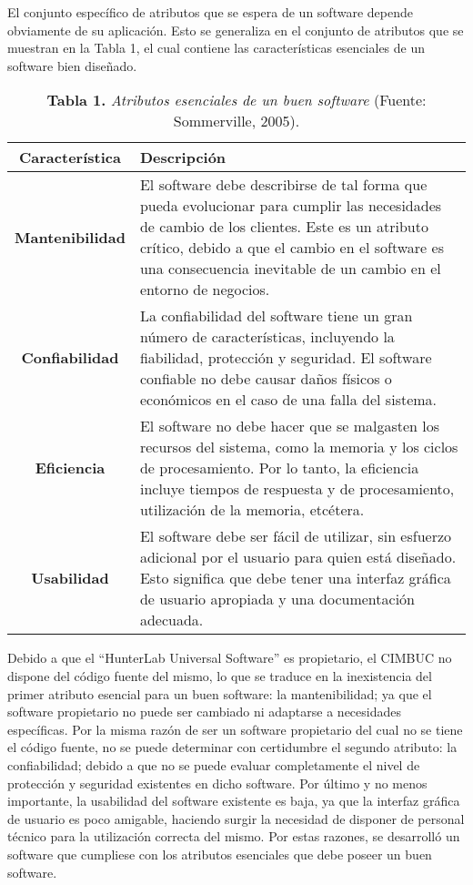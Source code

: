 El conjunto espec\'{i}fico de atributos que se espera de un software depende obviamente de su aplicaci\'{o}n. Esto se generaliza en el conjunto de atributos que se muestran en la Tabla 1, el cual contiene las caracter\'{i}sticas esenciales de un software bien dise\~{n}ado.

	\begin{table}[htb]
		\small
		\centering
		\setlength{\extrarowheight}{5pt}
		\begin{tabulary}{15cm}{|c|L|}
			\hline
			\textbf{Caracter\'{i}stica} & \textbf{Descripci\'{o}n}\\ \hline
			\textbf{Mantenibilidad} & El software debe describirse de tal forma que pueda evolucionar  para cumplir las necesidades de cambio de los 					clientes. Este es un atributo cr\'{i}tico, debido a que el cambio en el software es una consecuencia inevitable de un cambio en el entorno de negocios.\\ \hline
			\textbf{Confiabilidad} & La confiabilidad del software tiene un gran n\'{u}mero de caracter\'{i}sticas, incluyendo la fiabilidad, protecci\'{o}n y seguridad. El software confiable no debe causar da\~{n}os f\'{i}sicos o econ\'{o}micos en el caso de una falla del sistema.\\ \hline
			\textbf{Eficiencia} & El software no debe hacer que se malgasten los recursos del sistema, como la memoria y los ciclos de procesamiento. Por lo tanto, la eficiencia incluye tiempos de respuesta y de procesamiento, utilizaci\'{o}n de la memoria, etc\'{e}tera.\\ \hline
			\textbf{Usabilidad} & El software debe ser f\'{a}cil de utilizar, sin esfuerzo adicional por el usuario para quien est\'{a} dise\~{n}ado. Esto significa que debe tener una interfaz gr\'{a}fica de usuario apropiada y una documentaci\'{o}n adecuada.\\ \hline
	\end{tabulary}
			\caption{\textbf{Tabla 1.} \textit{Atributos esenciales de un buen software}		(Fuente: Sommerville, 2005).}
\end{table}
			\FloatBarrier %
Debido a que el ``HunterLab Universal Software'' es propietario, el CIMBUC no dispone del c\'{o}digo fuente del mismo, lo que se traduce en la inexistencia del primer atributo esencial para un buen software: la mantenibilidad; ya que el software propietario no puede ser cambiado ni adaptarse a necesidades espec\'{i}ficas. Por la misma raz\'{o}n de ser un software propietario del cual no se tiene el c\'{o}digo fuente, no se puede determinar con certidumbre el segundo atributo: la confiabilidad; debido a que no se puede evaluar completamente el nivel de protecci\'{o}n y seguridad existentes en dicho software. Por \'{u}ltimo y no menos importante, la usabilidad del software existente es baja, ya que la interfaz gr\'{a}fica de usuario es poco amigable, haciendo surgir la necesidad de disponer de personal t\'{e}cnico para la utilizaci\'{o}n correcta del mismo. Por estas razones, se desarroll\'{o} un software que cumpliese con los atributos esenciales que debe poseer un buen software.

